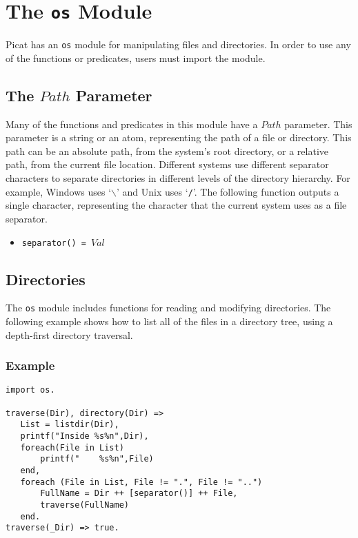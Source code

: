 \chapter{The \texttt{os} Module}
Picat has an \texttt{os} module for manipulating files and directories.  In order to use any of the functions or predicates, users must import the module.

\section{The $Path$ Parameter}
Many of the functions and predicates in this module have a $Path$ parameter.  This parameter is a string or an atom, representing the path of a file or directory.  This path can be an absolute path, from the system's root directory, or a relative path, from the current file location.  Different systems use different separator characters to separate directories in different levels of the directory hierarchy.  For example, Windows uses `\texttt{$\backslash$}' and Unix uses `\texttt{/}'.  The following function outputs a single character, representing the character that the current system uses as a file separator.
\begin{itemize}
\item \texttt{separator() = $Val$}
\end{itemize}

\section{Directories}
The \texttt{os} module includes functions for reading and modifying directories.  The following example shows how to list all of the files in a directory tree, using a depth-first directory traversal.

\subsection*{Example}
\begin{verbatim}
import os.

traverse(Dir), directory(Dir) =>
   List = listdir(Dir),
   printf("Inside %s%n",Dir),
   foreach(File in List)
       printf("    %s%n",File)
   end,
   foreach (File in List, File != ".", File != "..")
       FullName = Dir ++ [separator()] ++ File,
       traverse(FullName) 
   end.
traverse(_Dir) => true.
\end{verbatim}

